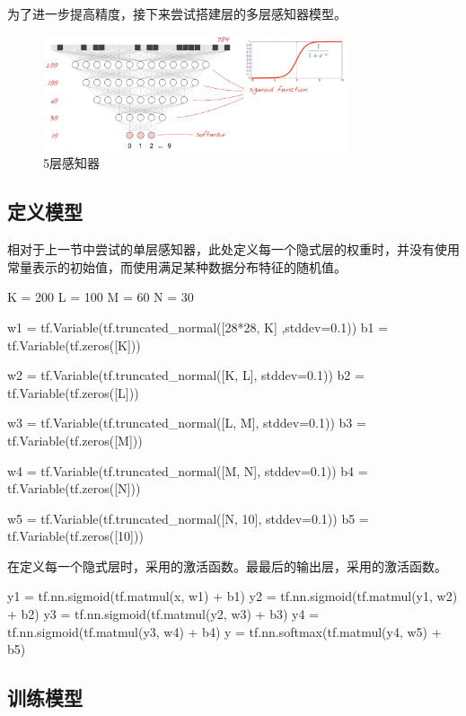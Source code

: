 \begin{content}

为了进一步提高精度，接下来尝试搭建层的多层感知器模型。

\begin{figure}[H]
\centering
\includegraphics[width=0.8\textwidth]{figures/mnist-5-layer.png}
\caption{5层感知器}
 \label{fig:mnist-5-layer}
\end{figure}

\subsection{定义模型}

相对于上一节中尝试的单层感知器，此处定义每一个隐式层的权重时，并没有使用常量表示的初始值，而使用满足某种数据分布特征的随机值。

\begin{leftbar}
\begin{python}
K = 200
L = 100
M = 60
N = 30

w1 = tf.Variable(tf.truncated_normal([28*28, K] ,stddev=0.1)) 
b1 = tf.Variable(tf.zeros([K]))

w2 = tf.Variable(tf.truncated_normal([K, L], stddev=0.1))
b2 = tf.Variable(tf.zeros([L]))

w3 = tf.Variable(tf.truncated_normal([L, M], stddev=0.1)) 
b3 = tf.Variable(tf.zeros([M]))

w4 = tf.Variable(tf.truncated_normal([M, N], stddev=0.1)) 
b4 = tf.Variable(tf.zeros([N]))

w5 = tf.Variable(tf.truncated_normal([N, 10], stddev=0.1)) 
b5 = tf.Variable(tf.zeros([10]))
\end{python}
\end{leftbar}

在定义每一个隐式层时，采用的激活函数。最最后的输出层，采用的激活函数。

\begin{leftbar}
\begin{python}
y1 = tf.nn.sigmoid(tf.matmul(x,  w1) + b1)
y2 = tf.nn.sigmoid(tf.matmul(y1, w2) + b2)
y3 = tf.nn.sigmoid(tf.matmul(y2, w3) + b3)
y4 = tf.nn.sigmoid(tf.matmul(y3, w4) + b4)
y  = tf.nn.softmax(tf.matmul(y4, w5) + b5)
\end{python}
\end{leftbar}

\subsection{训练模型}

\end{content}

